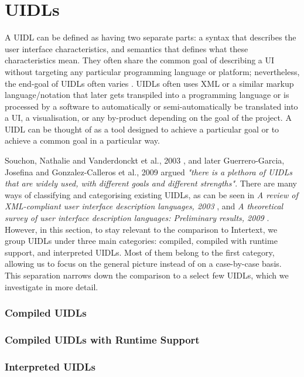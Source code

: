 
\section{UIDLs} \label{relatedUIDLs}

A UIDL can be defined as having two separate parts: a syntax that describes the user interface characteristics, and semantics that defines what these characteristics mean. They often share the common goal of describing a UI without targeting any particular programming language or platform; nevertheless, the end-goal of UIDLs often varies \cite{XMLCompliantUIDLs}. UIDLs often uses XML or a similar markup language/notation that later gets transpiled into a programming language or is processed by a software to automatically or semi-automatically be translated into a UI, a visualisation, or any by-product depending on the goal of the project. A UIDL can be thought of as a tool designed to achieve a particular goal or to achieve a common goal in a particular way. 

Souchon, Nathalie and Vanderdonckt et al., 2003 \cite{XMLCompliantUIDLs}, and later Guerrero-Garcia, Josefina and Gonzalez-Calleros et al., 2009 \cite{UIDLTheoreticalSurvey} argued \textit{"there is a plethora of UIDLs that are widely used, with different goals and different strengths"}. There are many ways of classifying and categorising existing UIDLs, as can be seen in \textit{A review of XML-compliant user interface description languages, 2003} \cite{XMLCompliantUIDLs}, and \textit{A theoretical survey of user interface description languages: Preliminary results, 2009} \cite{UIDLTheoreticalSurvey}. However, in this section, to stay relevant to the comparison to Intertext, we group UIDLs under three main categories: compiled, compiled with runtime support, and interpreted UIDLs. Most of them belong to the first category, allowing us to focus on the general picture instead of on a case-by-case basis. This separation narrows down the comparison to a select few UIDLs, which we investigate in more detail.

\subsubsection{Compiled UIDLs}

\subsubsection{Compiled UIDLs with Runtime Support}

\subsubsection{Interpreted UIDLs}
